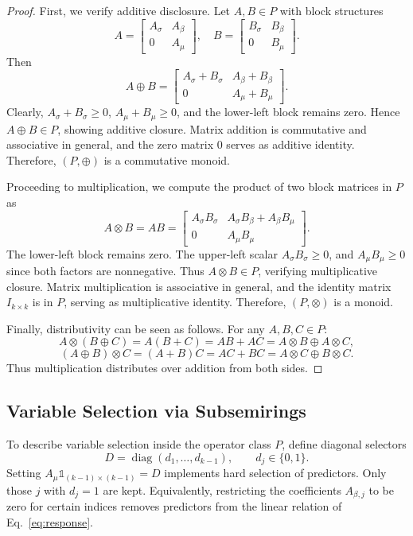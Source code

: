 \begin{proof}

First, we verify additive disclosure. Let $A, B \in P$ with block structures
\[
A = \begin{bmatrix} A_\sigma & A_\beta \\ 0 & A_\mu \end{bmatrix}, \quad
B = \begin{bmatrix} B_\sigma & B_\beta \\ 0 & B_\mu \end{bmatrix}.
\]
Then
\[
A \oplus B = \begin{bmatrix} A_\sigma + B_\sigma & A_\beta + B_\beta \\ 0 & A_\mu + B_\mu \end{bmatrix}.
\]
Clearly, $A_\sigma + B_\sigma \ge 0$, $A_\mu + B_\mu \ge 0$, and the lower-left block remains zero. Hence $A \oplus B \in P$, showing additive closure.  
Matrix addition is commutative and associative in general, and the zero matrix $0$ serves as additive identity. Therefore, $(P, \oplus)$ is a commutative monoid.

Proceeding to multiplication, we compute the product of two block matrices in $P$ as 
\[
A \otimes B = AB =
\begin{bmatrix} 
A_\sigma B_\sigma & A_\sigma B_\beta + A_\beta B_\mu \\ 
0 & A_\mu B_\mu
\end{bmatrix}.
\]
The lower-left block remains zero. The upper-left scalar $A_\sigma B_\sigma \ge 0$, and $A_\mu B_\mu \ge 0$ since both factors are nonnegative. Thus $A \otimes B \in P$, verifying multiplicative closure.  
Matrix multiplication is associative in general, and the identity matrix $I_{k \times k}$ is in $P$, serving as multiplicative identity. Therefore, $(P, \otimes)$ is a monoid.

Finally, distributivity can be seen as follows. For any $A,B,C \in P$:
\[
A \otimes (B \oplus C) = A(B+C) = AB + AC = A \otimes B \oplus A \otimes C,
\]
\[
(A \oplus B) \otimes C = (A+B)C = AC + BC = A \otimes C \oplus B \otimes C.
\]
Thus multiplication distributes over addition from both sides.
\end{proof}


\subsection{Variable Selection via Subsemirings}

To describe variable selection inside the operator class $P$, define diagonal selectors
\[
D = \operatorname{diag}(d_1,\dots,d_{k-1}),\qquad d_j\in\{0,1\}.
\]
Setting \(A_\mu \mathbb{1}_{(k-1)\times(k-1)}= D\) implements hard selection of predictors. Only those \(j\) with \(d_j=1\) are kept. Equivalently, restricting the coefficients \(A_{\beta,j}\) to be zero for certain indices removes predictors from the linear relation of Eq.~\eqref{eq:response}.

